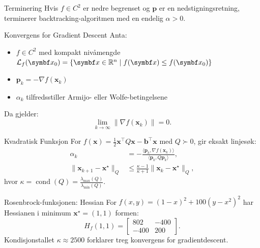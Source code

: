 \begin{lemma}{Terminering}{}
    Hvis \( f \in C^2 \) er nedre begrenset og \( \bm{p} \) er en nedstigningsretning, terminerer backtracking-algoritmen med en endelig \( \alpha > 0 \).
\end{lemma}

\begin{theorem}{Konvergens for Gradient Descent}{}
    Anta:
    \begin{itemize}
        \item \( f \in C^2 \) med kompakt nivåmengde \( \mathcal{L}_f(\bm{x}_0) = \{\bm{x} \in \R^n \mid f(\bm{x}) \leq f(\bm{x}_0)\} \)
        \item \( \bm{p}_k = -\nabla f(\bm{x}_k) \)
        \item \( \alpha_k \) tilfredsstiller Armijo- eller Wolfe-betingelsene
    \end{itemize}
    Da gjelder:
    \begin{equation}
        \lim_{k \to \infty} \|\nabla f(\bm{x}_k)\| = 0.
    \end{equation}
\end{theorem}

\begin{example}{Kvadratisk Funksjon}{}
    For \( f(\bm{x}) = \frac{1}{2} \bm{x}^\top Q \bm{x} - \bm{b}^\top \bm{x} \) med \( Q \succ 0 \), gir eksakt linjesøk:
    \begin{align*}
        \alpha_k                             & = -\frac{\langle \bm{p}_k, \nabla f(\bm{x}_k) \rangle}{\langle \bm{p}_k, Q \bm{p}_k \rangle}, \\
        \|\bm{x}_{k+1} - \bm{x}^\star\|_Q & \leq \frac{\kappa - 1}{\kappa + 1} \|\bm{x}_k - \bm{x}^\star\|_Q,
    \end{align*}
    hvor \( \kappa = \operatorname{cond}(Q) = \frac{\lambda_{\max}(Q)}{\lambda_{\min}(Q)} \).
\end{example}

\begin{example}{Rosenbrock-funksjonen: Hessian}{}
    For \( f(x,y) = (1 - x)^2 + 100(y - x^2)^2 \) har Hessianen i minimum \( \bm{x}^\star = (1,1) \) formen:
    \begin{equation}
        H_f(1,1) = \begin{bmatrix} 802 & -400 \\ -400 & 200 \end{bmatrix}.
    \end{equation}
    Kondisjonstallet \( \kappa \approx 2500 \) forklarer treg konvergens for gradientdescent.
\end{example}


